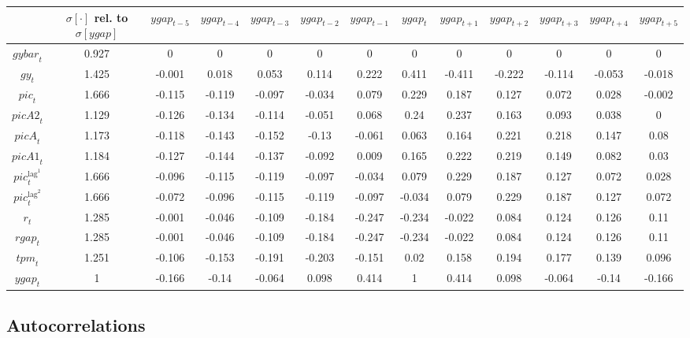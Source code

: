 \begin{tabular}{c|c|c|c|c|c|c|c|c|c|c|c|c|}
  & $\sigma[\cdot]$ rel. to $\sigma[{y\!g\!a\!p}]$ & ${y\!g\!a\!p}_{t-5}$ & ${y\!g\!a\!p}_{t-4}$ & ${y\!g\!a\!p}_{t-3}$ & ${y\!g\!a\!p}_{t-2}$ & ${y\!g\!a\!p}_{t-1}$ & ${y\!g\!a\!p}_{t}$ & ${y\!g\!a\!p}_{t+1}$ & ${y\!g\!a\!p}_{t+2}$ & ${y\!g\!a\!p}_{t+3}$ & ${y\!g\!a\!p}_{t+4}$ & ${y\!g\!a\!p}_{t+5}$\\
\hline
${g\!y\!b\!a\!r}_{t}$ & 0.927 & 0 & 0 & 0 & 0 & 0 & 0 & 0 & 0 & 0 & 0 & 0 \\
${g\!y}_{t}$ & 1.425 & -0.001 & 0.018 & 0.053 & 0.114 & 0.222 & 0.411 & -0.411 & -0.222 & -0.114 & -0.053 & -0.018 \\
${p\!i\!c}_{t}$ & 1.666 & -0.115 & -0.119 & -0.097 & -0.034 & 0.079 & 0.229 & 0.187 & 0.127 & 0.072 & 0.028 & -0.002 \\
${p\!i\!c\!A\!2}_{t}$ & 1.129 & -0.126 & -0.134 & -0.114 & -0.051 & 0.068 & 0.24 & 0.237 & 0.163 & 0.093 & 0.038 & 0 \\
${p\!i\!c\!A}_{t}$ & 1.173 & -0.118 & -0.143 & -0.152 & -0.13 & -0.061 & 0.063 & 0.164 & 0.221 & 0.218 & 0.147 & 0.08 \\
${p\!i\!c\!A\!1}_{t}$ & 1.184 & -0.127 & -0.144 & -0.137 & -0.092 & 0.009 & 0.165 & 0.222 & 0.219 & 0.149 & 0.082 & 0.03 \\
${p\!i\!c}^{\mathrm{lag}^{\mathrm{1}}}_{t}$ & 1.666 & -0.096 & -0.115 & -0.119 & -0.097 & -0.034 & 0.079 & 0.229 & 0.187 & 0.127 & 0.072 & 0.028 \\
${p\!i\!c}^{\mathrm{lag}^{\mathrm{2}}}_{t}$ & 1.666 & -0.072 & -0.096 & -0.115 & -0.119 & -0.097 & -0.034 & 0.079 & 0.229 & 0.187 & 0.127 & 0.072 \\
$r_{t}$ & 1.285 & -0.001 & -0.046 & -0.109 & -0.184 & -0.247 & -0.234 & -0.022 & 0.084 & 0.124 & 0.126 & 0.11 \\
${r\!g\!a\!p}_{t}$ & 1.285 & -0.001 & -0.046 & -0.109 & -0.184 & -0.247 & -0.234 & -0.022 & 0.084 & 0.124 & 0.126 & 0.11 \\
${t\!p\!m}_{t}$ & 1.251 & -0.106 & -0.153 & -0.191 & -0.203 & -0.151 & 0.02 & 0.158 & 0.194 & 0.177 & 0.139 & 0.096 \\
${y\!g\!a\!p}_{t}$ & 1 & -0.166 & -0.14 & -0.064 & 0.098 & 0.414 & 1 & 0.414 & 0.098 & -0.064 & -0.14 & -0.166 \\
\hline
\end{tabular}


\subsection{Autocorrelations}

